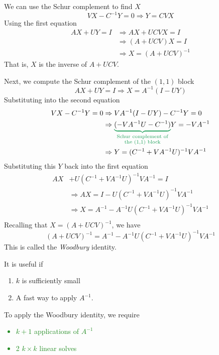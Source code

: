We can use the Schur complement to find $X$
%
\begin{equation*}
VX-C^{-1}Y=0 \Rightarrow Y=CVX
\end{equation*}
%
Using the first equation
\begin{align*}
AX + UY = I &\Rightarrow AX + UCVX = I\\
            &\Rightarrow (A+UCV)X = I \\
            &\Rightarrow X=(A+UCV)^{-1}
\end{align*}
%
That is, $X$ is the inverse of $A+UCV$.

Next, we compute the Schur complement of the $(1,1)$ block
\begin{equation*}
AX+UY=I \Rightarrow X=A^{-1}(I-UY)
\end{equation*}
%
Substituting into the second equation
%
\begin{align*}
  VX-C^{-1} Y = 0 &\Rightarrow VA^{-1}(I-UY)-C^{-1}Y=0 \\
                  &\Rightarrow \textcolor{ForestGreen}{\underbrace{
                  \color{black}(-VA^{-1}U-C^{-1})}_{
                      \substack{\text{Schur complement of} \\ \text{the (1,1) block}}
                  }}Y = -VA^{-1}\\
                  &\Rightarrow Y = (C^{-1} + VA^{-1}U)^{-1}VA^{-1}
\end{align*}
%
Substituting this $Y$ back into the first equation
%
\begin{align*}
AX&+U(C^{-1} + VA^{-1}U)^{-1}VA^{-1} = I\\
  &\Rightarrow AX = I - U(C^{-1} + VA^{-1}U)^{-1}VA^{-1}\\
  &\Rightarrow X = A^{-1} - A^{-1}U(C^{-1} + VA^{-1}U)^{-1}VA^{-1}\\
\end{align*}
Recalling that $X=(A+UCV)^{-1}$, we have 
%
\begin{equation*}
  (A+UCV)^{-1} = A^{-1} - A^{-1}U(C^{-1} + VA^{-1}U)^{-1}VA^{-1}
\end{equation*}
%
This is called the \emph{Woodbury} identity.

It is useful if
\begin{enumerate}[1)]
\item $k$ is sufficiently small
\item A fast way to apply $A^{-1}$.
\end{enumerate}

To apply the Woodbury identity, we require
%
\textcolor{ForestGreen}{
\begin{itemize}[label={}]
\item $k+1$ applications of $A^{-1}$ 
\item 2 $k \times k$ linear solves
\end{itemize}
}


